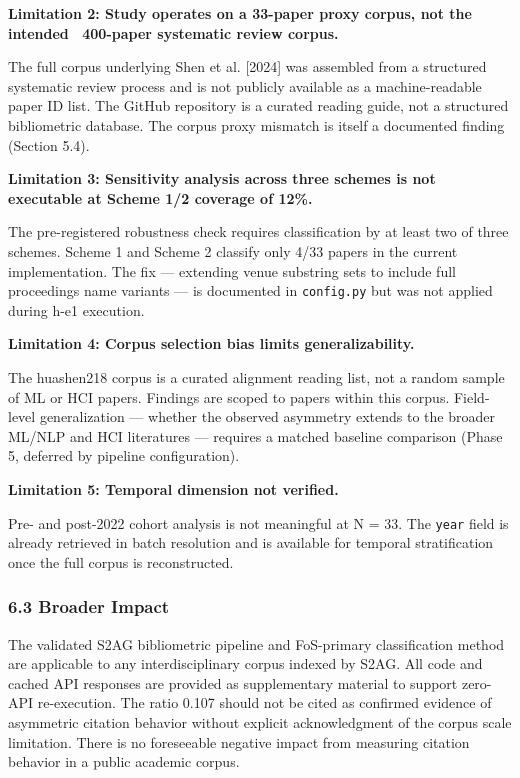 \textbf{Limitation 2: Study operates on a 33-paper proxy corpus, not the intended ~400-paper systematic review corpus.}

The full corpus underlying Shen et al. [2024] was assembled from a structured systematic review process and is not publicly available as a machine-readable paper ID list. The GitHub repository is a curated reading guide, not a structured bibliometric database. The corpus proxy mismatch is itself a documented finding (Section 5.4).

\textbf{Limitation 3: Sensitivity analysis across three schemes is not executable at Scheme 1/2 coverage of 12\%.}

The pre-registered robustness check requires classification by at least two of three schemes. Scheme 1 and Scheme 2 classify only 4/33 papers in the current implementation. The fix --- extending venue substring sets to include full proceedings name variants --- is documented in \texttt{config.py} but was not applied during h-e1 execution.

\textbf{Limitation 4: Corpus selection bias limits generalizability.}

The huashen218 corpus is a curated alignment reading list, not a random sample of ML or HCI papers. Findings are scoped to papers within this corpus. Field-level generalization --- whether the observed asymmetry extends to the broader ML/NLP and HCI literatures --- requires a matched baseline comparison (Phase 5, deferred by pipeline configuration).

\textbf{Limitation 5: Temporal dimension not verified.}

Pre- and post-2022 cohort analysis is not meaningful at N = 33. The \texttt{year} field is already retrieved in batch resolution and is available for temporal stratification once the full corpus is reconstructed.

\subsubsection{6.3 Broader Impact}

The validated S2AG bibliometric pipeline and FoS-primary classification method are applicable to any interdisciplinary corpus indexed by S2AG. All code and cached API responses are provided as supplementary material to support zero-API re-execution. The ratio 0.107 should not be cited as confirmed evidence of asymmetric citation behavior without explicit acknowledgment of the corpus scale limitation. There is no foreseeable negative impact from measuring citation behavior in a public academic corpus.

